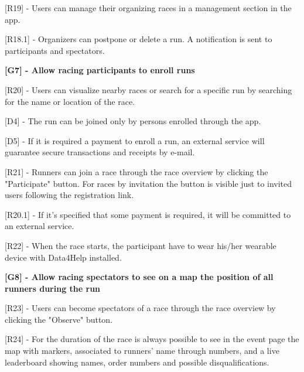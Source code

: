[R19] - Users can manage their organizing races in a management section in the app. \newline

\hspace{\parindent}[R18.1] - Organizers can postpone or delete a run. A notification is sent to participants and spectators. \newline

\hspace{-\parindent}\textbf{[G7] - Allow racing participants to enroll runs} \newline

[R20] - Users can visualize nearby races or search for a specific run by searching for the name or location of the race. \newline

[D4] - The run can be joined only by persons enrolled through the app. \newline

[D5] - If it is required a payment to enroll a run, an external service will guarantee secure transactions and receipts by e-mail. \newline

[R21] - Runners can join a race through the race overview by clicking the "Participate" button. For races by invitation the button is visible just to invited users following the registration link. \newline

\hspace{\parindent}[R20.1] - If it's specified that some payment is required, it will be committed to an external service. \newline

[R22] - When the race starts, the participant have to wear his/her wearable device with Data4Help installed. \newline

\hspace{-\parindent}\textbf{[G8] - Allow racing spectators to see on a map the position of all runners during the run} \newline

[R23] - Users can become spectators of a race through the race overview by clicking the "Observe" button. \newline

[R24] - For the duration of the race is always possible to see in the event page the map with markers, associated to runners' name through numbers, and a live leaderboard showing names, order numbers and possible disqualifications. \newline

